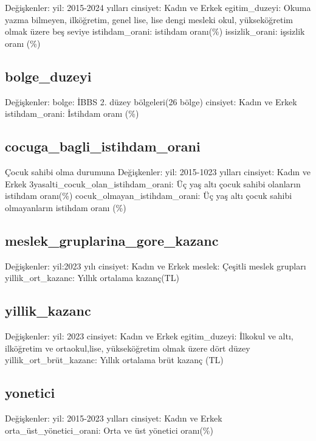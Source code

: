 \documentclass[
  11pt,
  a4paper,
  DIV=11,
  numbers=noendperiod]{scrartcl}
\begin{document}
Değişkenler: yil: 2015-2024 yılları cinsiyet: Kadın ve Erkek
egitim\_duzeyi: Okuma yazma bilmeyen, ilköğretim, genel lise, lise dengi
mesleki okul, yükseköğretim olmak üzere beş seviye istihdam\_orani:
istihdam oranı(\%) issizlik\_orani: işsizlik oranı (\%)

\subsection{bolge\_duzeyi}\label{bolge_duzeyi}

Değişkenler: bolge: İBBS 2. düzey bölgeleri(26 bölge) cinsiyet: Kadın ve
Erkek istihdam\_orani: İstihdam oranı (\%)

\subsection{cocuga\_bagli\_istihdam\_orani}\label{cocuga_bagli_istihdam_orani}

Çocuk sahibi olma durumuna Değişkenler: yil: 2015-1023 yılları cinsiyet:
Kadın ve Erkek 3yasalti\_cocuk\_olan\_istihdam\_orani: Üç yaş altı çocuk
sahibi olanların istihdam oranı(\%) cocuk\_olmayan\_istihdam\_orani: Üç
yaş altı çocuk sahibi olmayanların istihdam oranı (\%)

\subsection{meslek\_gruplarina\_gore\_kazanc}\label{meslek_gruplarina_gore_kazanc}

Değişkenler: yil:2023 yılı cinsiyet: Kadın ve Erkek meslek: Çeşitli
meslek grupları yillik\_ort\_kazanc: Yıllık ortalama kazanç(TL)

\subsection{yillik\_kazanc}\label{yillik_kazanc}

Değişkenler: yil: 2023 cinsiyet: Kadın ve Erkek egitim\_duzeyi: İlkokul
ve altı, ilköğretim ve ortaokul,lise, yükseköğretim olmak üzere dört
düzey yillik\_ort\_brüt\_kazanc: Yıllık ortalama brüt kazanç (TL)

\subsection{yonetici}\label{yonetici}

Değişkenler: yil: 2015-2023 yılları cinsiyet: Kadın ve Erkek
orta\_üst\_yönetici\_orani: Orta ve üst yönetici oranı(\%)
\end{document}
